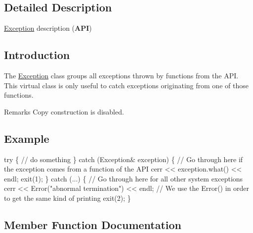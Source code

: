 \subsection{Detailed Description}
\mbox{\hyperlink{classHurricane_1_1Exception}{Exception}} description ({\bfseries A\+PI}) 

\hypertarget{classHurricane_1_1Exception_secExceptionIntro}{}\subsection{Introduction}\label{classHurricane_1_1Exception_secExceptionIntro}
The \mbox{\hyperlink{classHurricane_1_1Exception}{Exception}} class groups all exceptions thrown by functions from the A\+PI. This virtual class is only useful to catch exceptions originating from one of those functions.

\begin{DoxyRemark}{Remarks}
Copy construction is disabled.
\end{DoxyRemark}
\hypertarget{classHurricane_1_1Exception_secExceptionExample}{}\subsection{Example}\label{classHurricane_1_1Exception_secExceptionExample}

\begin{DoxyCode}
\textcolor{keywordflow}{try} \{
   \textcolor{comment}{// do something}
\}
\textcolor{keywordflow}{catch} (Exception& exception) \{
   \textcolor{comment}{// Go through here if the exception comes from a function of the API}
   cerr << exception.what() << endl;
   exit(1);
\}
\textcolor{keywordflow}{catch} (...) \{
   \textcolor{comment}{// Go through here for all other system exceptions}
   cerr << Error(\textcolor{stringliteral}{"abnormal termination"}) << endl;
   \textcolor{comment}{// We use the Error() in order to get the same kind of printing}
   exit(2);
\}
\end{DoxyCode}
 

\subsection{Member Function Documentation}
\mbox{\label{classHurricane_1_1Exception_a6d8036af345628567494eeab9c8e2e3a}} 
